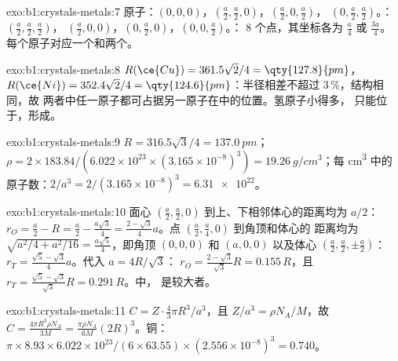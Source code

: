 \begin{solution}{exo:b1:crystals-metals:7}
原子：$(0,0,0)$，$(\frac a2,\frac a2,0)$，$(\frac a2,0,\frac a2)$，
$(0,\frac a2,\frac a2)$。：$(\frac a2,\frac a2,\frac a2)$，
$(\frac a2,0,0)$，$(0,\frac a2,0)$，$(0,0,\frac a2)$。：
8 个点，其坐标各为 $\frac a4$ 或 $\frac{3a}{4}$。
每个原子对应一个和两个。
\end{solution}

\begin{solution}{exo:b1:crystals-metals:8}
$R(\ce{Cu}) = 361.5\sqrt2/4 = \qty{127.8}{pm}$，$R(\ce{Ni}) = 352.4\sqrt2/4
= \qty{124.6}{pm}$：半径相差不超过 3\,\%，结构相同，故
两者中任一原子都可占据另一原子在中的位置。氢原子小得多，
只能位于，形成。
\end{solution}

\begin{solution}{exo:b1:crystals-metals:9}
$R = 316.5\sqrt3/4 = \qty{137.0}{pm}$；$\rho = 2 \times 183.84/(6.022 \times
10^{23} \times (3.165 \times 10^{-8})^3) = \qty{19.26}{g/cm^3}$；每
\unit{cm^3} 中的原子数：$2/a^3 = 2/(3.165 \times 10^{-8})^3 = \num{6.31e22}$。
\end{solution}

\begin{solution}{exo:b1:crystals-metals:10}
面心 $(\frac a2,\frac a2,0)$ 到上、下相邻体心的距离均为 $a/2$：
$r_O = \frac a2 - R = \frac a2 - \frac{a\sqrt3}{4}
= \frac{2-\sqrt3}{4}a$。点 $(\frac a2,\frac a4,0)$ 到角顶和体心的
距离均为 $\sqrt{a^2/4 + a^2/16} = \frac{a\sqrt5}{4}$，即角顶 $(0,0,0)$ 和
$(a,0,0)$ 以及体心 $(\frac a2,\frac a2,\pm\frac a2)$：
$r_T = \frac{\sqrt5 - \sqrt3}{4}a$。代入 $a = 4R/\sqrt3$：
$r_O = \frac{2-\sqrt3}{\sqrt3}R = 0.155\,R$，且
$r_T = \frac{\sqrt5-\sqrt3}{\sqrt3}R = 0.291\,R$。中，
是较大者。
\end{solution}

\begin{solution}{exo:b1:crystals-metals:11}
$C = Z\cdot\frac43\pi R^3/a^3$，且 $Z/a^3 = \rho N_A/M$，故 $C =
\frac{4\pi R^3\rho N_A}{3M} = \frac{\pi\rho N_A}{6M}(2R)^3$。铜：
$\pi \times 8.93 \times 6.022 \times 10^{23}/(6 \times 63.55) \times (2.556
\times 10^{-8})^3 = 0.740$。
\end{solution}


